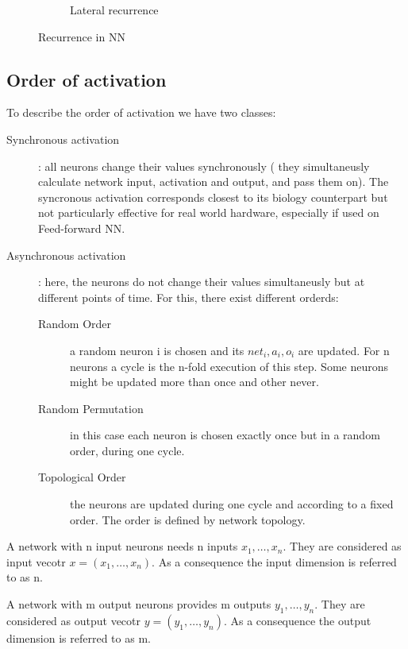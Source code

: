 \begin{figure}[htbp]
\begin{subfigure}{6cm}
        \caption{Lateral recurrence}
        \label{fig:sub3}
      \end{subfigure}
    \caption{Recurrence in NN}
    \label{fig:recurrence}
    \end{figure}
\subsection{Order of activation}
To describe the order of activation we have two classes:
\begin{description}
    \item[Synchronous activation]: all neurons change their values synchronously ( they simultaneusly calculate network input, activation and output, and pass them on). The syncronous activation corresponds closest to its biology counterpart but not particularly effective for real world hardware, especially if used on Feed-forward NN.
    \item[Asynchronous activation]: here, the neurons do not change their values simultaneusly but at different points of time. For this, there exist different orderds:
    \begin{description}
        \item[Random Order] a random neuron i is chosen and its $net_i, a_i, o_i$ are updated. For n neurons a cycle is the n-fold execution of this step. Some neurons might be updated more than once and other never.
        \item[Random Permutation] in this case each neuron is chosen exactly once but in a random order, during one cycle.
        \item[Topological Order] the neurons are updated during one cycle and according to a fixed order. The order is defined by network topology. 
    \end{description} 
\end{description}
\begin{definition}
    A network with n input neurons needs n inputs $x_{1}, \ldots,x_{n}$. They are considered as input vecotr $ x = (x_{1}, \ldots,x_{n})$. As a consequence the input dimension is referred to as n.
\end{definition}
\begin{definition}
    A network with m output neurons provides m outputs $y_{1}, \ldots,y_{n}$. They are considered as output vecotr $ y = (y_{1}, \ldots,y_{n})$. As a consequence the output dimension is referred to as m.
\end{definition}

